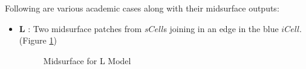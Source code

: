 Following are various academic cases along with their midsurface outputs:
\begin{itemize}[noitemsep,topsep=2pt,parsep=2pt,partopsep=2pt]

\item {\bf L} : Two midsurface patches from $sCell$s joining in an edge in the blue $iCell$.  (Figure \ref{fig_L})
	\begin{figure}[!h]
	\centering     %
	 \quad
	 \quad
	\caption{Midsurface for L Model} 
	\label{fig_L}
	\end{figure}
	

\end{itemize}
